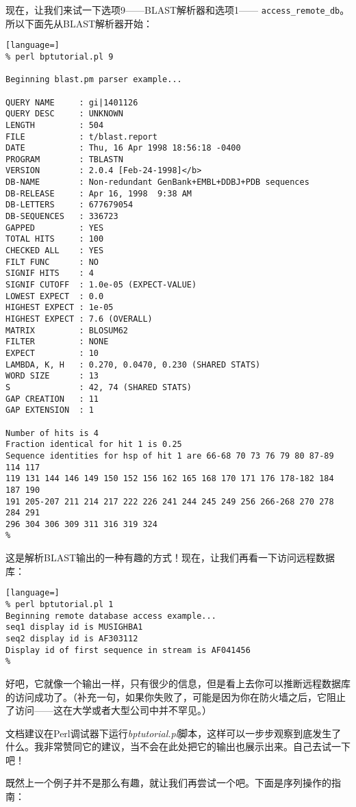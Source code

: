 现在，让我们来试一下选项9——BLAST解析器和选项1—— \verb|access_remote_db|。所以下面先从BLAST解析器开始：

\begin{lstlisting}[language=]
% perl bptutorial.pl 9

Beginning blast.pm parser example... 

QUERY NAME     : gi|1401126
QUERY DESC     : UNKNOWN
LENGTH         : 504
FILE           : t/blast.report
DATE           : Thu, 16 Apr 1998 18:56:18 -0400
PROGRAM        : TBLASTN
VERSION        : 2.0.4 [Feb-24-1998]</b>
DB-NAME        : Non-redundant GenBank+EMBL+DDBJ+PDB sequences
DB-RELEASE     : Apr 16, 1998  9:38 AM
DB-LETTERS     : 677679054
DB-SEQUENCES   : 336723
GAPPED         : YES
TOTAL HITS     : 100
CHECKED ALL    : YES
FILT FUNC      : NO
SIGNIF HITS    : 4
SIGNIF CUTOFF  : 1.0e-05 (EXPECT-VALUE)
LOWEST EXPECT  : 0.0
HIGHEST EXPECT : 1e-05
HIGHEST EXPECT : 7.6 (OVERALL)
MATRIX         : BLOSUM62
FILTER         : NONE
EXPECT         : 10
LAMBDA, K, H   : 0.270, 0.0470, 0.230 (SHARED STATS)
WORD SIZE      : 13
S              : 42, 74 (SHARED STATS)
GAP CREATION   : 11
GAP EXTENSION  : 1

Number of hits is 4 
Fraction identical for hit 1 is 0.25 
Sequence identities for hsp of hit 1 are 66-68 70 73 76 79 80 87-89 114 117
119 131 144 146 149 150 152 156 162 165 168 170 171 176 178-182 184 187 190
191 205-207 211 214 217 222 226 241 244 245 249 256 266-268 270 278 284 291
296 304 306 309 311 316 319 324 
%
\end{lstlisting}

这是解析BLAST输出的一种有趣的方式！现在，让我们再看一下访问远程数据库：

\begin{lstlisting}[language=]
% perl bptutorial.pl 1
Beginning remote database access example... 
seq1 display id is MUSIGHBA1 
seq2 display id is AF303112 
Display id of first sequence in stream is AF041456
% 
\end{lstlisting}

好吧，它就像一个输出一样，只有很少的信息，但是看上去你可以推断远程数据库的访问成功了。（补充一句，如果你失败了，可能是因为你在防火墙之后，它阻止了访问——这在大学或者大型公司中并不罕见。）

文档建议在Perl调试器下运行\textit{bptutorial.pl}脚本，这样可以一步步观察到底发生了什么。我非常赞同它的建议，当不会在此处把它的输出也展示出来。自己去试一下吧！

既然上一个例子并不是那么有趣，就让我们再尝试一个吧。下面是序列操作的指南：

